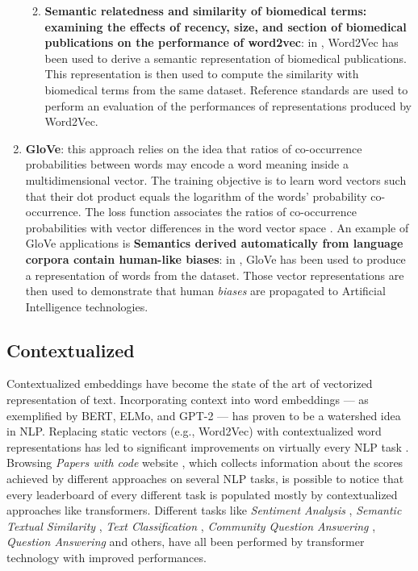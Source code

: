 \documentclass[\main/main.tex]{subfiles}
\begin{document}
\begin{enumerate}
\begin{enumerate}
\begin{enumerate}
        \end{enumerate}
        \item \textbf{Semantic relatedness and similarity of biomedical terms: examining the effects of recency, size, and section of biomedical publications on the performance of word2vec}: in \cite{Zhu2017SemanticRA}, Word2Vec has been used to derive a semantic representation of biomedical publications. This representation is then used to compute the similarity with biomedical terms from the same dataset. Reference standards are used to perform an evaluation of the performances of representations produced by Word2Vec.  
    \end{enumerate}
    
    \item \textbf{GloVe}: this approach relies on the idea that ratios of co-occurrence probabilities between words may encode a word meaning inside a multidimensional vector. The training objective is to learn word vectors such that their dot product equals the logarithm of the words' probability co-occurrence. The loss function associates the ratios of co-occurrence probabilities with vector differences in the word vector space \cite{pennington2014glove}.
    An example of GloVe applications is \textbf{Semantics derived automatically from language corpora contain human-like biases}: in  \cite{Caliskan2017SemanticsDA}, GloVe has been used to produce a representation of words from the dataset. Those vector representations are then used to demonstrate that human \emph{biases} are propagated to Artificial Intelligence technologies.
\end{enumerate}
\subsection{Contextualized}
Contextualized embeddings have become the state of the art of vectorized representation of text. Incorporating context into word embeddings --- as exemplified by BERT, ELMo, and GPT-2 --- has proven to be a watershed idea in NLP. Replacing static vectors (e.g., Word2Vec) with contextualized word representations has led to significant improvements on virtually every NLP task \cite{stanford_contextualized_blog_post}. Browsing \emph{Papers with code} website \cite{paperswithcode}, which collects information about the scores achieved by different approaches on several NLP tasks, is possible to notice that every leaderboard of every different task is populated mostly by contextualized approaches like transformers. Different tasks like \emph{Sentiment Analysis} \cite{paperswithcode_sa}, \emph{Semantic Textual Similarity} \cite{paperswithcode_sts}, \emph{Text Classification} \cite{paperswithcode_tc}, \emph{Community Question Answering} \cite{paperswithcode_cqa}, \emph{Question Answering} \cite{paperswithcode_qa} and others, have all been performed by transformer technology with improved performances.
\end{document}
